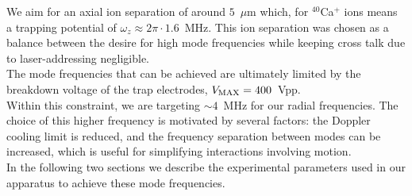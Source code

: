     We aim for an axial ion separation of around $5$~$\mu$m which, for
    $^{40}$Ca$^{+}$ ions means a trapping potential of $\omega_z \approx 2\pi
    \cdot 1.6$~MHz. This ion separation was chosen as a balance between the
    desire for high mode frequencies while keeping cross talk due to
    laser-addressing negligible.\\ The mode frequencies that can be achieved are
    ultimately limited by the breakdown voltage of the trap electrodes, $V_{\rm
    MAX} = 400$~Vpp.\\ Within this constraint, we are targeting $\sim 4$~MHz for
    our radial frequencies. The choice of this higher frequency is motivated by
    several factors: the Doppler cooling limit is reduced, and the frequency
    separation between modes can be increased, which is useful for simplifying
    interactions involving motion.\\ 
    In the following two sections we describe the experimental parameters used
    in our apparatus to achieve these mode frequencies.\\



